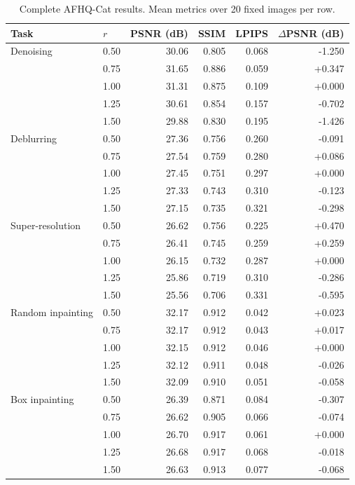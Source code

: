 \documentclass[10pt,letterpaper]{article}
\begin{document}
\clearpage
\begin{table}[p]\centering\small
\caption{Complete AFHQ-Cat results. Mean metrics over 20 fixed images per row.}
\label{tab:full-afhq_cat}
\begin{tabular}{llrrrr}
\toprule
Task & $r$ & PSNR (dB) & SSIM & LPIPS & $\Delta$PSNR (dB)\\
\midrule
Denoising & 0.50 & 30.06 & 0.805 & 0.068 & -1.250\\
 & 0.75 & 31.65 & 0.886 & 0.059 & +0.347\\
\rowcolor{control}
 & 1.00 & 31.31 & 0.875 & 0.109 & +0.000\\
 & 1.25 & 30.61 & 0.854 & 0.157 & -0.702\\
 & 1.50 & 29.88 & 0.830 & 0.195 & -1.426\\
\midrule
Deblurring & 0.50 & 27.36 & 0.756 & 0.260 & -0.091\\
 & 0.75 & 27.54 & 0.759 & 0.280 & +0.086\\
\rowcolor{control}
 & 1.00 & 27.45 & 0.751 & 0.297 & +0.000\\
 & 1.25 & 27.33 & 0.743 & 0.310 & -0.123\\
 & 1.50 & 27.15 & 0.735 & 0.321 & -0.298\\
\midrule
Super-resolution & 0.50 & 26.62 & 0.756 & 0.225 & +0.470\\
 & 0.75 & 26.41 & 0.745 & 0.259 & +0.259\\
\rowcolor{control}
 & 1.00 & 26.15 & 0.732 & 0.287 & +0.000\\
 & 1.25 & 25.86 & 0.719 & 0.310 & -0.286\\
 & 1.50 & 25.56 & 0.706 & 0.331 & -0.595\\
\midrule
Random inpainting & 0.50 & 32.17 & 0.912 & 0.042 & +0.023\\
 & 0.75 & 32.17 & 0.912 & 0.043 & +0.017\\
\rowcolor{control}
 & 1.00 & 32.15 & 0.912 & 0.046 & +0.000\\
 & 1.25 & 32.12 & 0.911 & 0.048 & -0.026\\
 & 1.50 & 32.09 & 0.910 & 0.051 & -0.058\\
\midrule
Box inpainting & 0.50 & 26.39 & 0.871 & 0.084 & -0.307\\
 & 0.75 & 26.62 & 0.905 & 0.066 & -0.074\\
\rowcolor{control}
 & 1.00 & 26.70 & 0.917 & 0.061 & +0.000\\
 & 1.25 & 26.68 & 0.917 & 0.068 & -0.018\\
 & 1.50 & 26.63 & 0.913 & 0.077 & -0.068\\
\bottomrule
\end{tabular}
\end{table}
\clearpage
\end{document}
